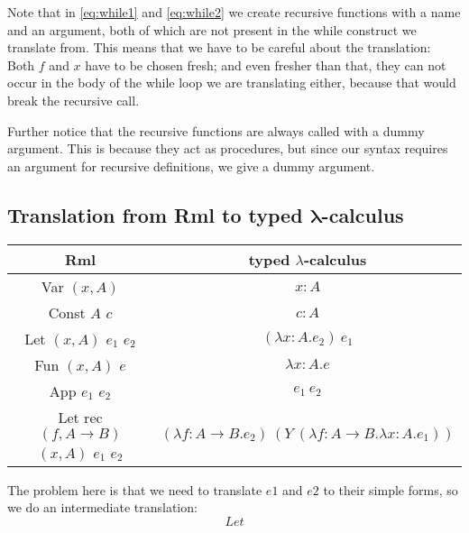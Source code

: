 \documentclass[11pt, leqno]{article}
\theoremstyle{definition}
\begin{document}
Note that in \ref{eq:while1} and \ref{eq:while2} we create recursive functions with a
name and an argument, both of which are not present in the while construct we
translate from. This means that we have to be careful about the translation: Both $f$
and $x$ have to be chosen fresh; and even fresher than that, they can not occur in
the body of the while loop we are translating either, because that would break the
recursive call.

Further notice that the recursive functions are always called with a dummy
argument. This is because they act as procedures, but since our syntax requires an
argument for recursive definitions, we give a dummy argument.


\subsection{Translation from Rml to typed $\mathbf{\lambda}$-calculus}
\begin{center}
  \begin{tabular}{|c|c|}
    \hline
    Rml & typed $\lambda$-calculus \\ \hline
    Var $(x,A)$ & $x : A$ \\
    Const $A$ $c$ & $c : A$ \\
    Let $(x,A)$ $e_1$ $e_2$ & $(\lambda x : A. e_2)~e_1$ \\
    Fun $(x,A)$ $e$ & $\lambda x : A. e$ \\
    App $e_1$ $e_2$ & $e_1~e_2$ \\
    Let rec $(f,A \rightarrow B)$ $(x,A)$ $e_1$ $e_2$ & $(\lambda f : A \rightarrow B. e_2)~(Y~(\lambda f : A \rightarrow B. \lambda x : A. e_1))$ \\ \hline
  \end{tabular}
\end{center}
The problem here is that we need to translate \(e1\) and \(e2\) to their simple forms, so we do an intermediate translation:
\[Let\]
\end{document}
